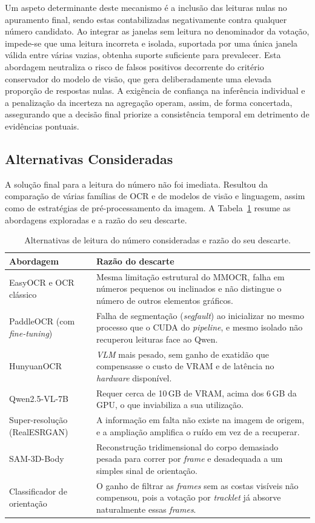 Um aspeto determinante deste mecanismo é a inclusão das leituras nulas no apuramento final, sendo
estas contabilizadas negativamente contra qualquer número candidato. Ao integrar as janelas sem
leitura no denominador da votação, impede-se que uma leitura incorreta e isolada, suportada por
uma única janela válida entre várias vazias, obtenha suporte suficiente para prevalecer. Esta
abordagem neutraliza o risco de falsos positivos decorrente do critério conservador do modelo de
visão, que gera deliberadamente uma elevada proporção de respostas nulas. A exigência de confiança
na inferência individual e a penalização da incerteza na agregação operam, assim, de forma
concertada, assegurando que a decisão final priorize a consistência temporal em detrimento de
evidências pontuais.

\subsection{Alternativas Consideradas}

A solução final para a leitura do número não foi imediata. Resultou da comparação de várias famílias
de OCR e de modelos de visão e linguagem, assim como de estratégias de pré-processamento da imagem.
A Tabela~\ref{tab:alternativas} resume as abordagens exploradas e a razão do seu descarte.

\begin{table}[htbp]
\centering
\caption{Alternativas de leitura do número consideradas e razão do seu descarte.}
\label{tab:alternativas}
\renewcommand{\arraystretch}{1.35}
\setlength{\tabcolsep}{6pt}
\begin{tabular}{|p{3.6cm}|p{9.0cm}|}
\hline
\textbf{Abordagem} & \textbf{Razão do descarte} \\
\hline
EasyOCR e OCR clássico &
Mesma limitação estrutural do MMOCR, falha em números pequenos ou inclinados e não
distingue o número de outros elementos gráficos. \\
\hline
PaddleOCR (com \emph{fine-tuning}) &
Falha de segmentação (\emph{segfault}) ao inicializar no mesmo processo que o CUDA do
\emph{pipeline}, e mesmo isolado não recuperou leituras face ao Qwen. \\
\hline
HunyuanOCR &
\emph{VLM} mais pesado, sem ganho de exatidão que compensasse o custo de VRAM e de
latência no \emph{hardware} disponível. \\
\hline
Qwen2.5-VL-7B &
Requer cerca de 10\,GB de VRAM, acima dos 6\,GB da GPU, o que inviabiliza a sua
utilização. \\
\hline
Super-resolução (\mbox{RealESRGAN}) &
A informação em falta não existe na imagem de origem, e a ampliação amplifica o ruído
em vez de a recuperar. \\
\hline
SAM-3D-Body &
Reconstrução tridimensional do corpo demasiado pesada para correr por \emph{frame} e
desadequada a um simples sinal de orientação. \\
\hline
Classificador de orientação &
O ganho de filtrar as \emph{frames} sem as costas visíveis não compensou, pois a votação
por \emph{tracklet} já absorve naturalmente essas \emph{frames}. \\
\hline
\end{tabular}
\end{table}



